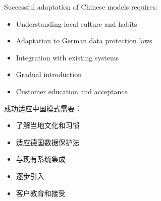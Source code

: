 Successful adaptation of Chinese models requires:
\begin{itemize}
    \item Understanding local culture and habits
    \item Adaptation to German data protection laws
    \item Integration with existing systems
    \item Gradual introduction
    \item Customer education and acceptance
\end{itemize}

成功适应中国模式需要：
\begin{itemize}
    \item 了解当地文化和习惯
    \item 适应德国数据保护法
    \item 与现有系统集成
    \item 逐步引入
    \item 客户教育和接受
\end{itemize}

